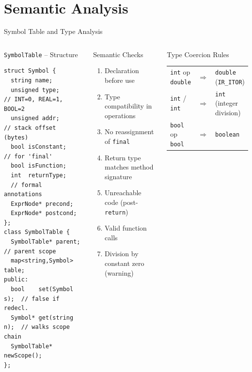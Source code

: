 \documentclass[aspectratio=169,11pt]{beamer}
\begin{document}
\section{Semantic Analysis}

\begin{frame}[fragile]{Symbol Table and Type Analysis}
\begin{columns}[t]
  \begin{block}{\texttt{SymbolTable} -- Structure}
\begin{lstlisting}[style=cppslide]
struct Symbol {
  string name;
  unsigned type;     // INT=0, REAL=1, BOOL=2
  unsigned addr;     // stack offset (bytes)
  bool isConstant;   // for 'final'
  bool isFunction;
  int  returnType;
  // formal annotations
  ExprNode* precond;
  ExprNode* postcond;
};
class SymbolTable {
  SymbolTable* parent; // parent scope
  map<string,Symbol> table;
public:
  bool    set(Symbol s);  // false if redecl.
  Symbol* get(string n);  // walks scope chain
  SymbolTable* newScope();
};
\end{lstlisting}
  \end{block}

  \begin{block}{Semantic Checks}
    \begin{enumerate}\small
      \item Declaration before use
      \item Type compatibility in operations
      \item No reassignment of \texttt{final}
      \item Return type matches method signature
      \item Unreachable code (post-\texttt{return})
      \item Valid function calls
      \item Division by constant zero (warning)
    \end{enumerate}
  \end{block}
  \begin{exampleblock}{Type Coercion Rules}
    \small
    \begin{tabular}{lcl}
      \texttt{int} op \texttt{double} & $\Rightarrow$ & \texttt{double} (\texttt{IR\_ITOR})\\
      \texttt{int} / \texttt{int}     & $\Rightarrow$ & \texttt{int} (integer division)\\
      \texttt{bool} op \texttt{bool}  & $\Rightarrow$ & \texttt{boolean}\\
    \end{tabular}
  \end{exampleblock}
\end{columns}
\end{frame}
\end{document}

